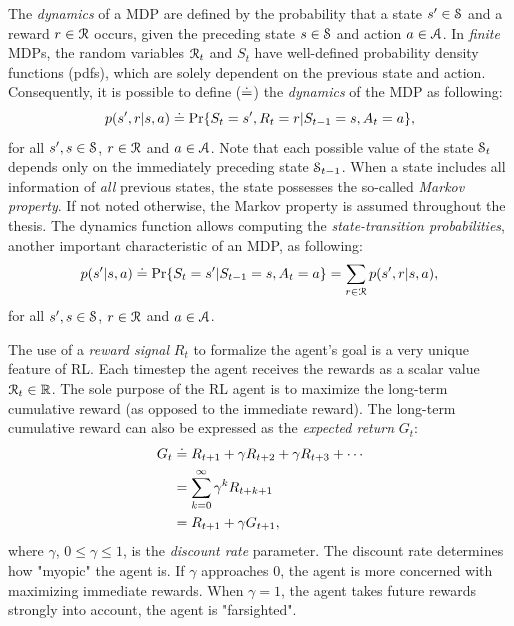 \documentclass[a4paper, twoside, 12pt]{article}
\begin{document}
The \emph{dynamics} of a MDP are defined by the probability that a state \(s'\in \S\)
and a reward \(r\in\R\) occurs, given the preceding state \(s\in\S\) and action
\(a\in\A\). In \emph{finite} MDPs, the random variables \(\R_t\) and \(S_t\) have
well-defined probability density functions (pdfs), which are solely dependent on
the previous state and action. Consequently, it is possible to define (\(\defeq\))
the \emph{dynamics} of the MDP as following:
\begin{equation}
    p(s',r|s,a) \defeq \Pr{S_t=s',R_t=r|S_{t-1}=s,A_t=a},
\end{equation}
for all \(s',s\in\S\), \(r\in\R\) and \(a\in\A\). Note that each possible value of
the state \(\S_t\) depends only on the immediately preceding state \(\S_{t-1}\).
When a state includes all information of \emph{all} previous states, the state
possesses the so-called \emph{Markov property}. If not noted otherwise, the Markov
property is assumed throughout the thesis.
The dynamics function allows computing the \emph{state-transition probabilities},
another important characteristic of an MDP, as following:
\begin{equation}
    p(s'|s,a) \defeq \Pr{S_t=s'|S_{t-1}=s,A_t=a} = \sum_{r\in\R}{p(s', r|s, a)},
\end{equation}
for all \(s',s\in\S\), \(r\in\R\) and \(a\in\A\).

The use of a \emph{reward signal} \(R_t\) to formalize the agent's goal is a very
unique feature of RL. Each timestep the agent receives the rewards as a scalar
value \(\R_t\in\Re\). The sole purpose of the RL agent is to maximize the
long-term cumulative reward (as opposed to the immediate reward). The long-term
cumulative reward can also be expressed as the \emph{expected return} \(G_t\):
\begin{equation}
\begin{split}
    G_t &\defeq R_{t+1} + \gamma R_{t+2} + \gamma R_{t+3} + \cdots \\
    &= \sum_{k=0}^{\infty}{\gamma^k R_{t+k+1}} \\
    &= R_{t+1} + \gamma G_{t+1},
\end{split}
\end{equation}
where \(\gamma\), \(0\leq\gamma\leq 1\), is the \emph{discount rate} parameter. The
discount rate determines how "myopic" the agent is. If \(\gamma\) approaches 0,
the agent is more concerned with maximizing immediate rewards. When \(\gamma =
1\), the agent takes future rewards strongly into account, the agent is
"farsighted".
\end{document}
